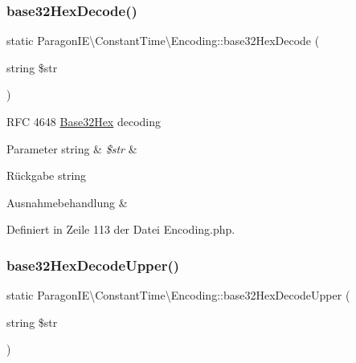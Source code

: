 \subsubsection{\texorpdfstring{base32\+Hex\+Decode()}{base32HexDecode()}}
{\footnotesize\ttfamily static Paragon\+I\+E\textbackslash{}\+Constant\+Time\textbackslash{}\+Encoding\+::base32\+Hex\+Decode (\begin{DoxyParamCaption}\item[{string}]{\$str }\end{DoxyParamCaption})\hspace{0.3cm}{\ttfamily [static]}}

R\+FC 4648 \mbox{\hyperlink{class_paragon_i_e_1_1_constant_time_1_1_base32_hex}{Base32\+Hex}} decoding


\begin{DoxyParams}[1]{Parameter}
string & {\em \$str} & \\
\hline
\end{DoxyParams}
\begin{DoxyReturn}{Rückgabe}
string 
\end{DoxyReturn}

\begin{DoxyExceptions}{Ausnahmebehandlung}
{\em } & \\
\hline
\end{DoxyExceptions}


Definiert in Zeile 113 der Datei Encoding.\+php.

\mbox{\label{class_paragon_i_e_1_1_constant_time_1_1_encoding_a485a402c0d7bc250ba13d045d1559524}} 
\subsubsection{\texorpdfstring{base32\+Hex\+Decode\+Upper()}{base32HexDecodeUpper()}}
{\footnotesize\ttfamily static Paragon\+I\+E\textbackslash{}\+Constant\+Time\textbackslash{}\+Encoding\+::base32\+Hex\+Decode\+Upper (\begin{DoxyParamCaption}\item[{string}]{\$str }\end{DoxyParamCaption})\hspace{0.3cm}{\ttfamily [static]}}

